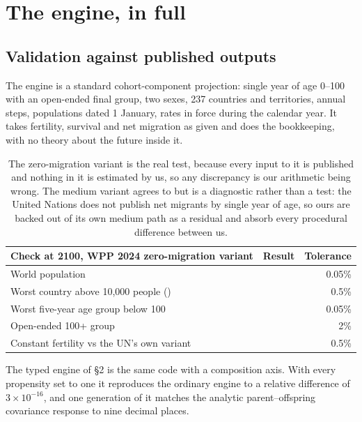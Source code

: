 \section{The engine, in full}
\label{app:engine}

\subsection{Validation against published outputs}

The engine is a standard cohort-component projection: single year of age 0--100
with an open-ended final group, two sexes, 237 countries and territories, annual
steps, populations dated 1 January, rates in force during the calendar year. It
takes fertility, survival and net migration as given and does the bookkeeping,
with no theory about the future inside it.

\begin{table}[h]
\centering
\small
\begin{tabular}{lrr}
\toprule
Check at 2100, WPP 2024 zero-migration variant & Result & Tolerance \\
\midrule
World population                                  & \ValidationWorld{}   & 0.05\% \\
Worst country above 10{,}000 people (\ValidationWorstCountry{}) & \ValidationCountry{} & 0.5\% \\
Worst five-year age group below 100               & \ValidationAge{}     & 0.05\% \\
Open-ended 100+ group                             & \ValidationOpenAge{} & 2\% \\
Constant fertility vs the UN's own variant        & \ValidationConstantFertility{} & 0.5\% \\
\bottomrule
\end{tabular}
\caption{The zero-migration variant is the real test, because every input to it
is published and nothing in it is estimated by us, so any discrepancy is our
arithmetic being wrong. The medium variant agrees to
\ValidationMediumDiagnostic{} but is a diagnostic rather than a test: the United
Nations does not publish net migrants by single year of age, so ours are backed
out of its own medium path as a residual and absorb every procedural difference
between us.}
\label{tab:validation}
\end{table}

The typed engine of \S2 is the same code with a composition axis. With every
propensity set to one it reproduces the ordinary engine to a relative difference
of $3\times10^{-16}$, and one generation of it matches the analytic
parent--offspring covariance response to nine decimal places.

